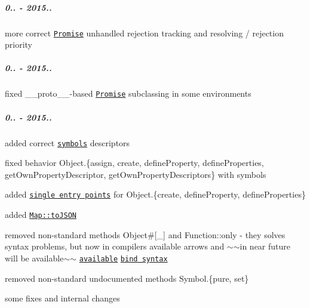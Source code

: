 \subparagraph*{0.. -\/ 2015..}


\begin{DoxyItemize}
\item more correct \href{https://github.com/zloirock/core-js/#ecmascript-6-promise}{\tt {\ttfamily Promise}} unhandled rejection tracking and resolving / rejection priority
\end{DoxyItemize}

\subparagraph*{0.. -\/ 2015..}


\begin{DoxyItemize}
\item fixed {\ttfamily \+\_\+\+\_\+proto\+\_\+\+\_\+}-\/based \href{https://github.com/zloirock/core-js/#ecmascript-6-promise}{\tt {\ttfamily Promise}} subclassing in some environments
\end{DoxyItemize}

\subparagraph*{0.. -\/ 2015..}


\begin{DoxyItemize}
\item added correct \href{https://github.com/zloirock/core-js/#ecmascript-6-symbol}{\tt symbols} descriptors
\begin{DoxyItemize}
\item fixed behavior {\ttfamily Object.\{assign, create, define\+Property, define\+Properties, get\+Own\+Property\+Descriptor, get\+Own\+Property\+Descriptors\}} with symbols
\item added \href{https://github.com/zloirock/core-js/#commonjs}{\tt single entry points} for {\ttfamily Object.\{create, define\+Property, define\+Properties\}}
\end{DoxyItemize}
\item added \href{https://github.com/zloirock/core-js/#ecmascript-7-proposals}{\tt {\ttfamily Map\+::to\+J\+S\+ON}}
\item removed non-\/standard methods {\ttfamily Object\#\mbox{[}\+\_\+\mbox{]}} and {\ttfamily Function\+::only} -\/ they solves syntax problems, but now in compilers available arrows and $\sim$$\sim$in near future will be available$\sim$$\sim$ \href{http://babeljs.io/blog/2015/05/14/function-bind/}{\tt available} \href{https://github.com/zenparsing/es-function-bind}{\tt bind syntax}
\item removed non-\/standard undocumented methods {\ttfamily Symbol.\{pure, set\}}
\item some fixes and internal changes
\end{DoxyItemize}

